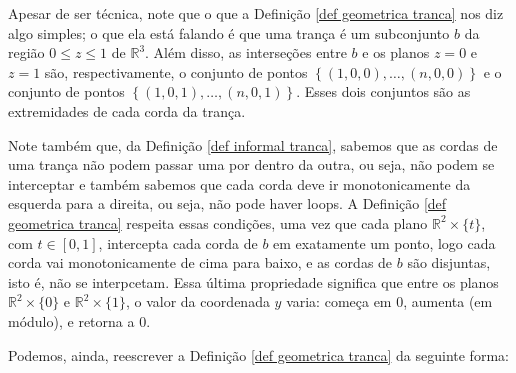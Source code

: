 	\begin{remark}
		Apesar de ser técnica, note que o que a Definição \eqref{def geometrica tranca} nos diz algo simples; o que ela está falando é que uma trança é um subconjunto $b$ da região $0\leq z\leq 1 $ de $\mathbb{R}^3$. Além disso, as interseções entre $b$ e os planos $z = 0$ e $z = 1$ são, respectivamente, o conjunto de pontos $\left\{  (1,0,0), \dots, (n,0,0)\right\}$ e o conjunto de pontos $\left\{ (1,0,1), \dots, (n,0,1) \right\}$. Esses dois conjuntos são as extremidades de cada corda da trança.
		
		\par\vspace{0.3cm} Note também que, da Definição \eqref{def informal tranca}, sabemos que as cordas de uma trança não podem passar uma por dentro da outra, ou seja, não podem se interceptar e também sabemos que cada corda deve ir monotonicamente da esquerda para a direita, ou seja, não pode haver loops. A Definição \eqref{def geometrica tranca} respeita essas condições, uma vez que cada plano $\mathbb{R}^2\times\{t\}$, com $t\in [0,1]$, intercepta cada corda de $b$ em exatamente um ponto, logo cada corda vai monotonicamente de cima para baixo, e as cordas de $b$ são disjuntas, isto é, não se interpcetam. Essa última propriedade significa que entre os planos $\mathbb{R}^2\times \{0\}$ e $\mathbb{R}^2\times \{1\}$, o valor da coordenada $y$ varia: começa em $0$, aumenta (em módulo), e retorna a $0$.
	\end{remark}
	
	\par\vspace{0.3cm} Podemos, ainda, reescrever a Definição \eqref{def geometrica tranca} da seguinte forma:
	
